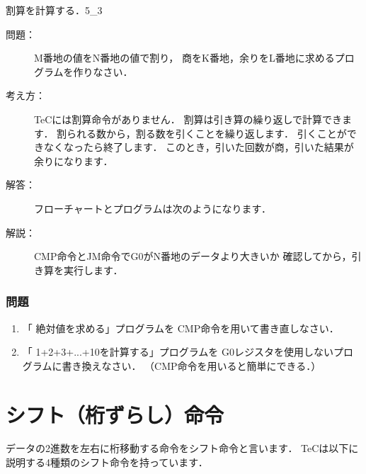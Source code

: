 \newpage
\begin{reidai}{割算を計算する．}{5_3}
\begin{description}
\item[問題：]
M番地の値をN番地の値で割り，
商をK番地，余りをL番地に求めるプログラムを作りなさい．

\item[考え方：]
TeCには割算命令がありません．
割算は引き算の繰り返しで計算できます．
割られる数から，割る数を引くことを繰り返します．
引くことができなくなったら終了します．
このとき，引いた回数が商，引いた結果が余りになります．

\item[解答：]
フローチャートとプログラムは次のようになります．\\

\begin{center}
\end{center}

\item[解説：]CMP命令とJM命令でG0がN番地のデータより大きいか
確認してから，引き算を実行します．

\end{description}
\end{reidai}

\vfill
\subsubsection{問題}
\begin{enumerate}
\item 「 絶対値を求める」プログラムを
CMP命令を用いて書き直しなさい．

\item 「 1+2+3+...+10を計算する」プログラムを
G0レジスタを使用しないプログラムに書き換えなさい．
（CMP命令を用いると簡単にできる．）
\end{enumerate}
\vfill

\newpage
\section{シフト（桁ずらし）命令}
データの2進数を左右に桁移動する命令をシフト命令と言います．
TeCは以下に説明する4種類のシフト命令を持っています．

